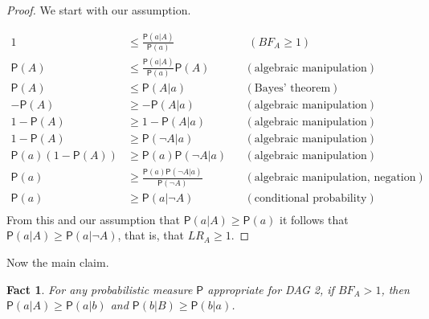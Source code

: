 \documentclass[
  10pt,
  dvipsnames,enabledeprecatedfontcommands]{scrartcl}
\newtheorem{fact}{Fact}
\newcommand{\n}{\neg}
\newcommand{\pr}[1]{\ensuremath{\mathsf{P}(#1)}}
\begin{document}
\begin{proof} We start with our assumption.


\begin{align*}
1 & \leq \frac{\pr{a \vert A}}{\pr{a}} & &  \,\, (BF_A \geq 1) \\
\pr{A} & \leq  \frac{\pr{a \vert A}}{\pr{a}} \pr{A} & & (\mbox{algebraic manipulation}) \\
\pr{A} & \leq \pr{A \vert a} & &  (\mbox{Bayes' theorem})  \\
- \pr{A} &\geq - \pr{A \vert a} &  &   (\mbox{algebraic manipulation}) \\
1- \pr{A} & \geq 1 - \pr{A \vert a} & & (\mbox{algebraic manipulation})\\
1- \pr{A}  & \geq \pr{\n A \vert a} & & (\mbox{algebraic manipulation})\\
\pr{a}\left( 1 - \pr{A}\right) & \geq \pr{a}\pr{\n A \vert a}  & & (\mbox{algebraic manipulation})\\
\pr{a} & \geq \frac{\pr{a} \pr{\n A \vert a}}{\pr{\n A}} &  & (\mbox{algebraic manipulation, negation}) \\
\pr{a} & \geq \pr{a \vert \n A}  & &   (\mbox{conditional probability}) \\
\end{align*}
From this and our assumption  that $\pr{a \vert A} \geq \pr{a}$ it follows that $\pr{a \vert A}\geq \pr{a \vert \n A}$, that is, that \mbox{$LR_A \geq 1$}.
\end{proof}

Now the main claim.

\begin{fact}
For any probabilistic measure $\mathsf{P}$ appropriate for \textsf{DAG 2}, if $BF_A >1$, then $\pr{a \vert A} \geq \pr{a \vert b}$ and 
$\pr{b \vert B} \geq \pr{b \vert a}$.
\end{fact}
\end{document}
